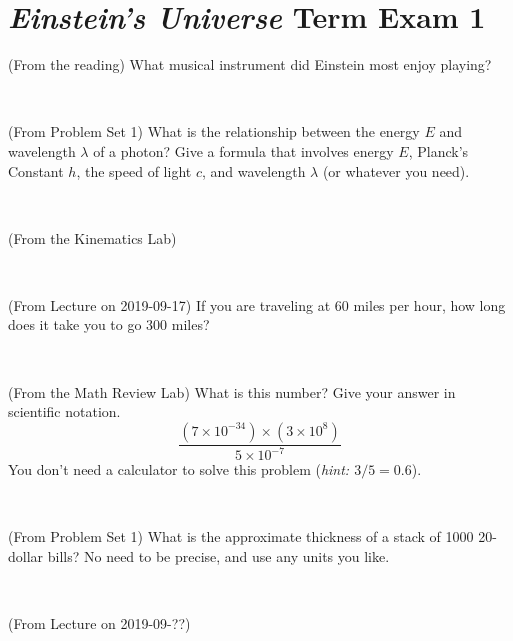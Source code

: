 \documentclass[12pt, letterpaper]{article}
\begin{document}
\section*{\textsl{Einstein's Universe} Term Exam 1}
\setcounter{problem}{1}


\begin{problem} (From the reading)
What musical instrument did Einstein most enjoy playing?
\end{problem}


\vfill ~

\begin{problem} (From Problem Set 1)
What is the relationship between the energy $E$ and wavelength
$\lambda$ of a photon? Give a formula that involves energy $E$,
Planck's Constant $h$, the speed of light $c$, and wavelength
$\lambda$ (or whatever you need).
\end{problem}

\vfill ~

\begin{problem} (From the Kinematics Lab)

\end{problem}


\vfill ~

\begin{problem} (From Lecture on 2019-09-17)
If you are traveling at 60 miles per hour, how long does
it take you to go 300 miles?
\end{problem}


\vfill ~


\clearpage


\begin{problem} (From the Math Review Lab)
What is this number? Give your answer in scientific notation.
$$
\frac{(7\times10^{-34})\times(3\times10^8)}{5\times10^{-7}}
$$
You don't need a calculator to solve this problem (\textit{hint: $3/5=0.6$}).
\end{problem}


\vfill ~

\begin{problem} (From Problem Set 1)
What is the approximate thickness of a stack of 1000 20-dollar bills?
No need to be precise, and use any units you like.
\end{problem}


\vfill ~

\begin{problem} (From Lecture on 2019-09-??)
\end{problem}
\end{document}
